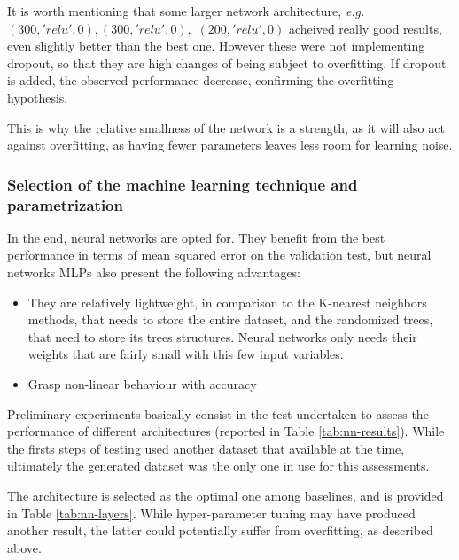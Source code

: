 It is worth mentioning that some larger network architecture, \textit{e.g.} $(300, 'relu', 0), (300, 'relu', 0),$ $(200, 'relu', 0)$ acheived really good results, even slightly better than the best one. However these were not implementing dropout, so that they are high changes of being subject to overfitting. If dropout is added, the observed performance decrease, confirming the overfitting hypothesis.

This is why the relative smallness of the network is a strength, as it will also act against overfitting, as having fewer parameters leaves less room for learning noise.

\subsubsection{Selection of the machine learning technique and parametrization}

In the end, neural networks are opted for. They benefit from the best performance in terms of mean squared error on the validation test, but neural networks MLPs also present the following advantages:
\begin{itemize}
    \item They are relatively lightweight, in comparison to the K-nearest neighbors methods, that needs to store the entire dataset, and the randomized trees, that need to store its trees structures. Neural networks only needs their weights that are fairly small with this few input variables.
    \item Grasp non-linear behaviour with accuracy
\end{itemize}

Preliminary experiments basically consist in the test undertaken to assess the performance of different architectures (reported in Table \ref{tab:nn-results}). While the firsts steps of testing used another dataset that available at the time, ultimately the generated dataset was the only one in use for this assessments.

The architecture is selected as the optimal one among baselines, and is provided in Table \ref{tab:nn-layers}. While hyper-parameter tuning may have produced another result, the latter could potentially suffer from overfitting, as described above. 

